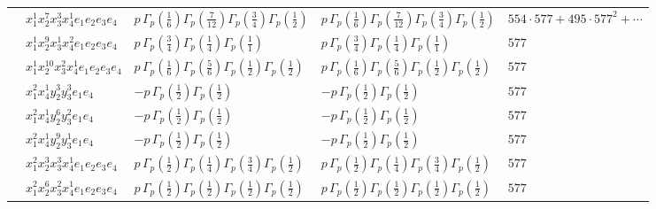 \documentclass[11pt]{article}
\begin{document}
\begin{table}[ht]
{\begin{tabular}{@{}lllll@{}}
 & $x_{1}^{1} x_{2}^{7} x_{3}^{3} x_{4}^{1}  e_{1} e_{2} e_{3} e_{4}$ & $p \, \Gamma_p \left( \frac{1}{6} \right) \Gamma_p \left( \frac{7}{12} \right) \Gamma_p \left( \frac{3}{4} \right) \Gamma_p \left( \frac{1}{2} \right)$ & $p \, \Gamma_p \left( \frac{1}{6} \right) \Gamma_p \left( \frac{7}{12} \right) \Gamma_p \left( \frac{3}{4} \right) \Gamma_p \left( \frac{1}{2} \right)$ & $554{\cdot}577{+}495{\cdot}577^{2}{+}\cdots$ \\
 & $x_{1}^{1} x_{2}^{9} x_{3}^{1} x_{4}^{2}  e_{1} e_{2} e_{3} e_{4}$ & $p \, \Gamma_p \left( \frac{3}{4} \right) \Gamma_p \left( \frac{1}{4} \right) \Gamma_p \left( \frac{1}{1} \right)$ & $p \, \Gamma_p \left( \frac{3}{4} \right) \Gamma_p \left( \frac{1}{4} \right) \Gamma_p \left( \frac{1}{1} \right)$ & $577$ \\
 & $x_{1}^{1} x_{2}^{10} x_{3}^{2} x_{4}^{1}  e_{1} e_{2} e_{3} e_{4}$ & $p \, \Gamma_p \left( \frac{1}{6} \right) \Gamma_p \left( \frac{5}{6} \right) \Gamma_p \left( \frac{1}{2} \right) \Gamma_p \left( \frac{1}{2} \right)$ & $p \, \Gamma_p \left( \frac{1}{6} \right) \Gamma_p \left( \frac{5}{6} \right) \Gamma_p \left( \frac{1}{2} \right) \Gamma_p \left( \frac{1}{2} \right)$ & $577$ \\
 & $x_{1}^{2} x_{4}^{1} y_{2}^{3} y_{3}^{3} e_{1} e_{4}$ & $- p \, \Gamma_p \left( \frac{1}{2} \right) \Gamma_p \left( \frac{1}{2} \right)$ & $- p \, \Gamma_p \left( \frac{1}{2} \right) \Gamma_p \left( \frac{1}{2} \right)$ & $577$ \\
 & $x_{1}^{2} x_{4}^{1} y_{2}^{6} y_{3}^{2} e_{1} e_{4}$ & $- p \, \Gamma_p \left( \frac{1}{2} \right) \Gamma_p \left( \frac{1}{2} \right)$ & $- p \, \Gamma_p \left( \frac{1}{2} \right) \Gamma_p \left( \frac{1}{2} \right)$ & $577$ \\
 & $x_{1}^{2} x_{4}^{1} y_{2}^{9} y_{3}^{1} e_{1} e_{4}$ & $- p \, \Gamma_p \left( \frac{1}{2} \right) \Gamma_p \left( \frac{1}{2} \right)$ & $- p \, \Gamma_p \left( \frac{1}{2} \right) \Gamma_p \left( \frac{1}{2} \right)$ & $577$ \\
 & $x_{1}^{2} x_{2}^{3} x_{3}^{3} x_{4}^{1}  e_{1} e_{2} e_{3} e_{4}$ & $p \, \Gamma_p \left( \frac{1}{2} \right) \Gamma_p \left( \frac{1}{4} \right) \Gamma_p \left( \frac{3}{4} \right) \Gamma_p \left( \frac{1}{2} \right)$ & $p \, \Gamma_p \left( \frac{1}{2} \right) \Gamma_p \left( \frac{1}{4} \right) \Gamma_p \left( \frac{3}{4} \right) \Gamma_p \left( \frac{1}{2} \right)$ & $577$ \\
 & $x_{1}^{2} x_{2}^{6} x_{3}^{2} x_{4}^{1}  e_{1} e_{2} e_{3} e_{4}$ & $p \, \Gamma_p \left( \frac{1}{2} \right) \Gamma_p \left( \frac{1}{2} \right) \Gamma_p \left( \frac{1}{2} \right) \Gamma_p \left( \frac{1}{2} \right)$ & $p \, \Gamma_p \left( \frac{1}{2} \right) \Gamma_p \left( \frac{1}{2} \right) \Gamma_p \left( \frac{1}{2} \right) \Gamma_p \left( \frac{1}{2} \right)$ & $577$ \\

\end{tabular}}
\end{table}
\end{document}
